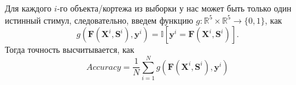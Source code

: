 \documentclass{article}
\begin{document}
    Для каждого $i$-го объекта/кортежа из выборки у нас может быть только один истинный стимул, следовательно, введем функцию $g : \mathbb{R}^5 \times \mathbb{R}^5 \rightarrow \{0, 1\}$, как 
    $$
        g\left( \mathbf{F}\left( \mathbf{X}^i, \mathbf{S}^i\right), \mathbf{y}^i \right) = \mathbb{I} \left[ \mathbf{y}^i = \mathbf{F}\left( \mathbf{X}^i, \mathbf{S}^i\right) \right].
    $$
    Тогда точность высчитывается, как 
    $$
        Accuracy = \frac{1}{N} \sum_{i=1}^N g\left( \mathbf{F}\left( \mathbf{X}^i, \mathbf{S}^i\right), \mathbf{y}^i \right)
    $$


    
    
    


\end{document}
